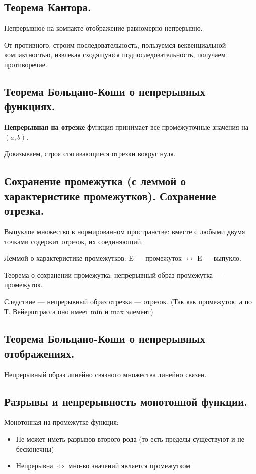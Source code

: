\documentclass[12pt, a4paper]{article}
\begin{document}
\subsection{Теорема Кантора.}

Непрерывное на компакте отображение равномерно непрерывно.

От противного, строим последовательность, 
пользуемся веквенциальной компактностью, извлекая сходящуюся подпоследовательность, получаем противоречие.

\subsection{Теорема Больцано-Коши о непрерывных функциях.}

\textbf{Непрерывная на отрезке} функция принимает все промежуточные значения на $(a, b)$.

Доказываем, строя стягивающиеся отрезки вокруг нуля.


\subsection{Сохранение промежутка (с леммой о характеристике промежутков). Сохранение отрезка.}

Выпуклое множество в нормированном пространстве: вместе с любыми двумя точками содержит отрезок, их соединяющий.

Леммой о характеристике промежутков: 
E — промежуток $\leftrightarrow$ E — выпукло.

Теорема о сохранении промежутка: непрерывный образ промежутка — промежуток.

Следствие — непрерывный образ отрезка — отрезок. (Так как промежуток, а по Т. Вейерштрасса оно имеет min и max элемент)


\subsection{Теорема Больцано-Коши о непрерывных отображениях.}

Непрерывный образ линейно связного множества линейно связен.


\subsection{Разрывы и непрерывность монотонной функции.}

Монотонная на промежутке функция:

\begin{itemize}
    \item Не может иметь разрывов второго рода (то есть пределы существуют и не бесконечны)
    \item Непрерывна $\Longleftrightarrow$ мно-во значений является промежутком
\end{itemize}
\end{document}
